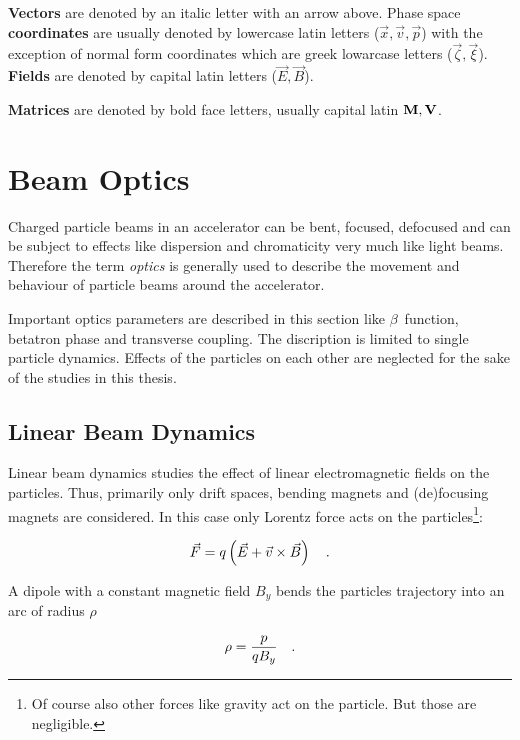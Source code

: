 \textbf{Vectors} are denoted by an italic letter with an arrow above. Phase space \textbf{coordinates} are
usually denoted by lowercase latin letters ($\vec{x}, \vec{v}, \vec{p}$) with the exception of normal form coordinates
which are greek lowarcase letters ($\vec{\zeta}, \vec{\xi}$). \textbf{Fields} are denoted by capital
latin letters ($\vec{E}, \vec{B}$).

\textbf{Matrices} are denoted by bold face letters, usually capital latin $\mathbf{M}, \mathbf{V}$.

\section{Beam Optics}

Charged particle beams in an accelerator can be bent, focused, defocused and can be subject to effects
like dispersion and chromaticity very much like light beams. Therefore the term \emph{optics} is
generally used to describe the movement and behaviour of particle beams around the accelerator.

Important optics parameters are described in this section like $\beta$~function, betatron phase and
transverse coupling.
The discription is limited to single particle dynamics. Effects of the particles on each other are
neglected for the sake of the studies in this thesis.

\subsection{Linear Beam Dynamics}

Linear beam dynamics studies the effect of linear electromagnetic fields on the particles.
Thus, primarily only drift spaces, bending magnets and (de)focusing magnets are considered.
In this case only Lorentz force acts on the particles\footnote{Of course also other forces like gravity
act on the particle. But those are negligible.}:

\begin{equation}
    \vec{F} = q\left(\vec{E} + \vec{v} \times \vec{B}\right)
    \quad .
    \label{eq_lorentz_force}
\end{equation}

A dipole with a constant magnetic field $B_y$ bends the particles trajectory into an arc of radius $\rho$

\begin{equation}
    \rho = \frac{p}{qB_y}
    \quad .
    \label{eq_acc_radius}
\end{equation}

